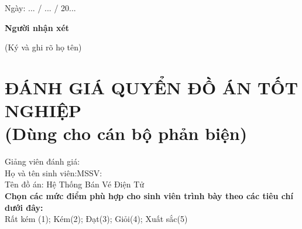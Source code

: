 \hspace{9cm} Ngày: ... / ... / 20...

\hspace{9.3cm}\textbf{Người nhận xét}

\vspace{-6pt}
\hspace{9cm}(Ký và ghi rõ họ tên)
\cleardoublepage

\section*{ĐÁNH GIÁ QUYỂN ĐỒ ÁN TỐT NGHIỆP\\\fontsize{14pt}{0pt}\selectfont \vspace{4pt}\textnormal{(Dùng cho cán bộ phản biện)}}
\thispagestyle{empty}
\vspace{-16pt}
\hspace{-1cm}Giảng viên đánh giá:\dotfill\\
Họ và tên sinh viên:\dotfill MSSV:\dotfill\\
Tên đồ án: Hệ Thống Bán Vé Điện Tử
\\
\textbf{Chọn các mức điểm phù hợp cho sinh viên trình bày theo các tiêu chí dưới đây:}\\
Rất kém (1); Kém(2); Đạt(3); Giỏi(4); Xuất sắc(5)
